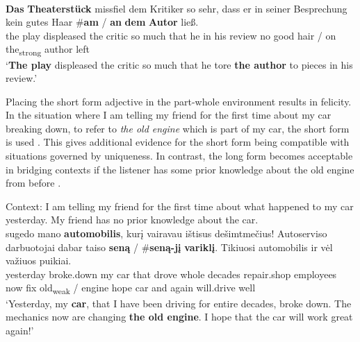 \documentclass[output=paper,
modfonts
]{langscibook}
\begin{document}
\begin{exe}
	\ex \label{ex:sereikaite:53}
	 \citep[53]{Schwarz2009} \\
	\gll \textbf{Das} \textbf{Theaterstück} {missfiel} {dem} {Kritiker} {so} {sehr}, {dass} {er} {in} {seiner} {Besprechung} {kein} {gutes} {Haar} \textnormal{\#}\textbf{am} \textnormal{/} \textbf{an} \textbf{dem} \textbf{Autor} {ließ}.\\
	{the} {play} displeased the critic so much that he in his review no good hair  / {on} {the\textsubscript{strong}} {author} left\\
	\trans ‘\textbf{The play} displeased the critic so much that he tore \textbf{the author} to pieces in his review.’ 
\end{exe}


Placing the short form adjective in the part-whole environment results in felicity. In the situation where I am telling my friend for the first time about my car breaking down, to refer to \textit{the old engine} which is part of my car, the short form is used . This gives additional evidence for the short form being compatible with situations governed by uniqueness. In contrast, the long form becomes acceptable in bridging contexts if the listener has some prior knowledge about the old engine from before . 


\begin{exe}
	\ex \label{ex:sereikaite:54}
	Context: I am telling my friend for the first time about what happened to my car yesterday. My friend has no prior knowledge about the car. \\
	 {sugedo} {mano} {\textbf{automobilis}}, {kurį} {vairavau} {ištisus} {dešimtmečius}! {Autoserviso} {darbuotojai} {dabar} {taiso} \textbf{seną} \textnormal{/} \textnormal{\#}\textbf{seną-jį} {\textbf{variklį}}. {Tikiuosi} {automobilis} {ir} {vėl} {važiuos} {puikiai}.\\
	yesterday broke.down my {car} that drove whole decades repair.shop employees now fix {old\textsubscript{weak}} /  {engine} hope car and again will.drive well \\
	\trans `Yesterday, my \textbf{car}, that I have been driving for entire decades, broke down. The mechanics now are changing \textbf{the old engine}. I hope that the car will work great again!' 
\end{exe} 
\end{document}
